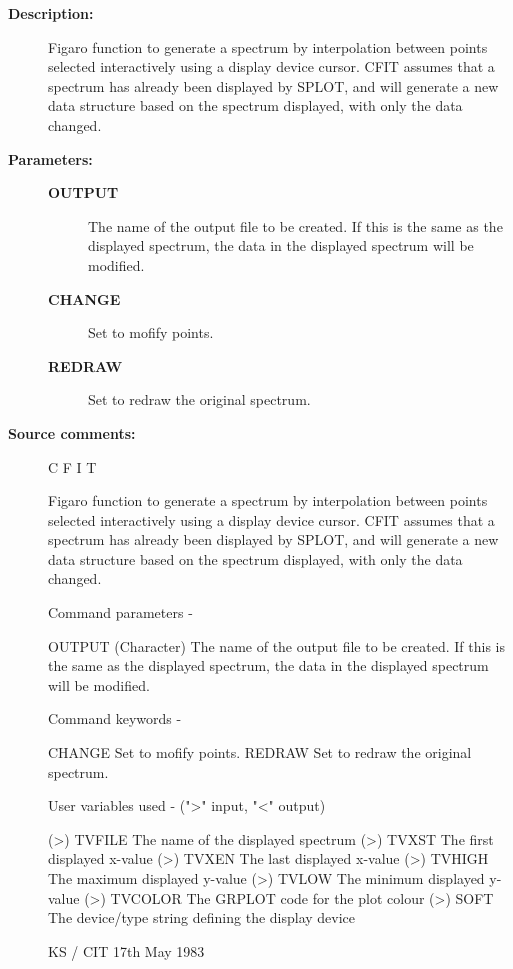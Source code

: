 \begin{description}

\item [\textbf{Description:}]
 Figaro function to generate a spectrum by interpolation
 between points selected interactively using a display
 device cursor.  CFIT assumes that a spectrum has already
 been displayed by SPLOT, and will generate a new data
 structure based on the spectrum displayed, with only the
 data changed.

\item [\textbf{Parameters:}]
\begin{description}
\item [\textbf{OUTPUT}]
 The name of the output file to be created.  If this is the same as
 the displayed spectrum, the data in the displayed spectrum will be
 modified.
\item [\textbf{CHANGE}]
 Set to mofify points.
\item [\textbf{REDRAW}]
 Set to redraw the original spectrum.
\end{description}

\item [\textbf{Source comments:}]
\begin{terminalv}
 C F I T

 Figaro function to generate a spectrum by interpolation
 between points selected interactively using a display
 device cursor.  CFIT assumes that a spectrum has already
 been displayed by SPLOT, and will generate a new data
 structure based on the spectrum displayed, with only the
 data changed.

 Command parameters -

 OUTPUT      (Character) The name of the output file to
             be created.  If this is the same as the displayed
             spectrum, the data in the displayed spectrum will
             be modified.

 Command keywords -

 CHANGE      Set to mofify points.
 REDRAW      Set to redraw the original spectrum.

 User variables used -  (">" input, "<" output)

 (>) TVFILE  The name of the displayed spectrum
 (>) TVXST   The first displayed x-value
 (>) TVXEN   The last displayed x-value
 (>) TVHIGH  The maximum displayed y-value
 (>) TVLOW   The minimum displayed y-value
 (>) TVCOLOR The GRPLOT code for the plot colour
 (>) SOFT    The device/type string defining the display device

                                          KS / CIT 17th May 1983
\end{terminalv}
\end{description}
